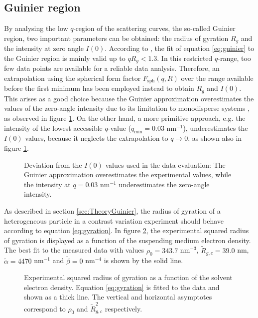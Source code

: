 \subsection{Guinier region}
\label{sec:guinier_analysis}
By analysing the low \(q \)-region of the scattering curves, the so-called Guinier region, two important parameters can be obtained: the radius of gyration \(R_g\) and the intensity at zero angle \(I(0)\). According to \cite{feigin_structure_1987}, the fit of equation \eqref{eq:guinier} to the Guinier region is mainly valid up to \( qR_g<1.3 \). In this restricted \(q\)-range, too few data points are available for a reliable data analysis. Therefore, an extrapolation using the spherical form factor \( F_{\text{sph}}(q,R) \) over the range available before the first minimum has been employed instead to obtain \(R_g\) and \(I(0)\). This arises as a good choice because the Guinier approximation overestimates the values of the zero-angle intensity due to its limitation to monodisperse systems \citep{feigin_structure_1987}, as observed in figure \ref{fig:KiskerIntensityComparison}. On the other hand, a more primitive approach, e.g. the intensity of the lowest accessible $q$-value ($q_{\text{min}}=0.03$ nm$^{-1}$), underestimates the $I(0)$ values, because it neglects the extrapolation to $q\rightarrow0$, as shown also in figure \ref{fig:KiskerIntensityComparison}.

\begin{figure}%
	\centering
		
		\caption[Deviation from the $I(0)$ used in the evaluation of the PS-COOH particles experimental data.]{Deviation from the $I(0)$ values used in the data evaluation: The Guinier approximation overestimates the experimental values, while the intensity at $q=0.03$ nm$^{-1}$ underestimates the zero-angle intensity.}
		\label{fig:KiskerIntensityComparison}
\end{figure}

As described in section \ref{sec:TheoryGuinier}, the radius of gyration of a heterogeneous particle in a contrast variation experiment should behave according to equation \eqref{eq:gyration}. In figure \ref{fig:KiskerGuinierRadius}, the experimental squared radius of gyration is displayed as a function of the suspending medium electron density. The best fit to the measured data with values \(\rho_0=343.7\) nm\(^{-3}\), \( \tilde R_{g,c}=39.0\) nm, \(\tilde \alpha=4470\) nm\(^{-1}\) and \(\tilde\beta=0\) nm\(^{-4}\) is shown by the solid line. 

\begin{figure}%
	\centering
		
		\caption[Radius of gyration of the PS-COOH particles.]{Experimental squared radius of gyration as a function of the solvent electron density. Equation \eqref{eq:gyration} is fitted to the data and shown as a thick line. The vertical and horizontal asymptotes correspond to $\rho_0$ and $\tilde R^2_{g,c}$ respectively.}
		\label{fig:KiskerGuinierRadius}
\end{figure}


